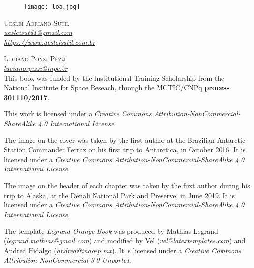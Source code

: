 \newpage
\thispagestyle{empty}

\begin{figure}[H]
    \centering
    \vspace*{\fill}
    \texttt{[image: loa.jpg]}
    \vspace{1cm}
\end{figure}


\noindent \textsc{Ueslei Adriano Sutil} 
\\
\noindent \textcolor{bleu_cite}{\href{mailto:uesleisutil1@gmail.com}{\textit{uesleisutil1@gmail.com}}}
\\  %
\noindent \textcolor{bleu_cite}{\href{https://www.uesleisutil.com.br}{\textit{https://www.uesleisutil.com.br}}}
\bigskip

\noindent \textsc{Luciano Ponzi Pezzi}
\\
\noindent \textcolor{bleu_cite}{\href{mailto:luciano.pezzi@inpe.br}{\textit{luciano.pezzi@inpe.br}}}  %
\bigskip
\\

\noindent This book was funded by the Institutional Training Scholarship from the National Institute for Space Reseach, through the MCTIC/CNPq \textbf{process 301110/2017}.
\bigskip

\noindent This work is licensed under a \textit{Creative Commons Attribution-NonCommercial-ShareAlike 4.0 International License}.
\bigskip

\noindent The image on the cover was taken by the first author at the Brazilian Antarctic Station Commander Ferraz on his first trip to Antarctica,
          in October 2016. It is licensed under a \textit{Creative Commons Attribution-NonCommercial-ShareAlike 4.0 International License}. 
\bigskip

\noindent The image on the header of each chapter was taken by the first author during his trip to Alaska, at the Denali National Park and Preserve, in June 2019. 
          It is licensed under a \textit{Creative Commons Attribution-NonCommercial-ShareAlike 4.0 International License}. 
\bigskip

\noindent The template \textit{Legrand Orange Book} was produced by Mathias Legrand (\textcolor{bleu_cite}{\href{mailto:legrand.mathias@gmail.com}{\textit{legrand.mathias@gmail.com}}}) 
          and modified by Vel (\textcolor{bleu_cite}{\href{mailto:vel@latextemplates.com}{\textit{vel@latextemplates.com}}}) and Andrea Hidalgo (\textcolor{bleu_cite}{\href{mailto:andrea@inaoep.mx}{\textit{andrea@inaoep.mx}}}). 
          It is licensed under a \textit{Creative Commons Attribution-NonCommercial 3.0 Unported}.
\bigskip

